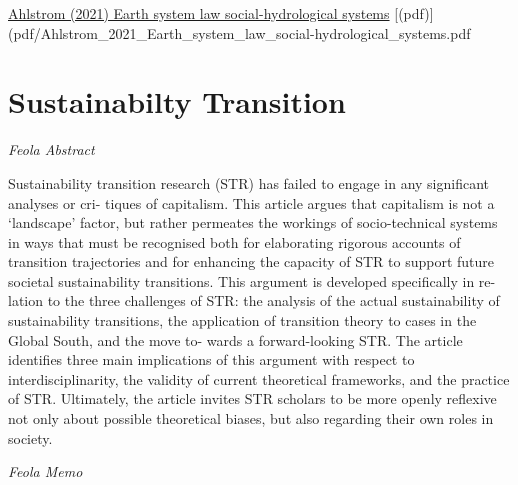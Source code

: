 \documentclass[
]{book}
\begin{document}
\href{https://www.sciencedirect.com/science/article/pii/S2589811621000240}{Ahlstrom (2021) Earth system law social-hydrological systems}
{[}(pdf){]}(pdf/Ahlstrom\_2021\_Earth\_system\_law\_social-hydrological\_systems.pdf

\hypertarget{sustainabilty-transition}{%
\chapter{Sustainabilty Transition}\label{sustainabilty-transition}}

\emph{Feola Abstract}

Sustainability transition research (STR) has failed to engage in any significant analyses or cri-
tiques of capitalism. This article argues that capitalism is not a `landscape' factor, but rather
permeates the workings of socio-technical systems in ways that must be recognised both for
elaborating rigorous accounts of transition trajectories and for enhancing the capacity of STR to
support future societal sustainability transitions. This argument is developed specifically in re-
lation to the three challenges of STR: the analysis of the actual sustainability of sustainability
transitions, the application of transition theory to cases in the Global South, and the move to-
wards a forward-looking STR. The article identifies three main implications of this argument with
respect to interdisciplinarity, the validity of current theoretical frameworks, and the practice of
STR. Ultimately, the article invites STR scholars to be more openly reflexive not only about
possible theoretical biases, but also regarding their own roles in society.

\emph{Feola Memo}
\end{document}
